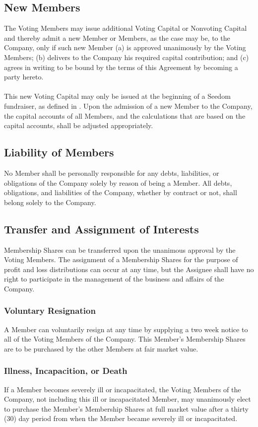 \documentclass[11pt]{article}
\begin{document}
\subsection{New Members}
The Voting Members may issue additional Voting Capital or Nonvoting Capital and thereby admit a new Member or Members, as the case may be, to the Company, only if such new Member (a) is approved unanimously by the Voting Members; (b) delivers to the Company his required capital contribution; and (c) agrees in writing to be bound by the terms of this Agreement by becoming a party hereto.\\\\
This new Voting Capital may only be issued at the beginning of a Seedom fundraiser, as defined in \label{sec:seedomFundraiserSchedule}. Upon the admission of a new Member to the Company, the capital accounts of all Members, and the calculations that are based on the capital accounts, shall be adjusted appropriately.

\subsection{Liability of Members}
No Member shall be personally responsible for any debts, liabilities, or obligations of the Company solely by reason of being a Member. All debts, obligations, and liabilities of the Company, whether by contract or not, shall belong solely to the Company.

\subsection{Transfer and Assignment of Interests}
Membership Shares can be transferred upon the unanimous approval by the Voting Members. The assignment of a Membership Shares for the purpose of profit and loss distributions can occur at any time, but the Assignee shall have no right to participate in the management of the business and affairs of the Company.

\subsubsection{Voluntary Resignation}
A Member can voluntarily resign at any time by supplying a two week notice to all of the Voting Members of the Company. This Member’s Membership Shares are to be purchased by the other Members at fair market value.

\subsubsection{Illness, Incapacition, or Death}
If a Member becomes severely ill or incapacitated, the Voting Members of the Company, not including this ill or incapacitated Member, may unanimously elect to purchase the Member's Membership Shares at full market value after a thirty (30) day period from when the Member became severely ill or incapacitated.
\end{document}
